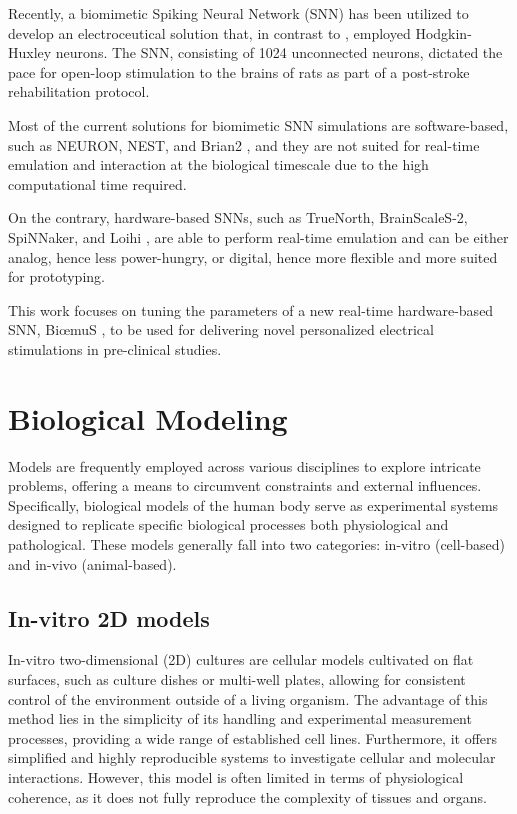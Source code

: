 Recently, a biomimet\-ic Spiking Neural Network (SNN) has been utilized to develop an electroceutical solution \cite{DiFlorio2023} that, in contrast to \cite{Buccelli2019}, employed Hodgkin-Huxley neurons. The SNN, consisting of 1024 unconnected neurons, dictated the pace for open-loop stimulation to the brains of rats as part of a post-stroke rehabilitation protocol.

Most of the current solutions for biomimetic SNN simulations are soft\-ware-based, such as NEURON, NEST, and Brian2 \cite{HinesCarnevale2001,GewaltigDiesmann2007,Stimberg2019}, and they are not suited for real-time emulation and interaction at the biological timescale due to the high computational time required.

On the contrary, hardware-based SNNs, such as TrueNorth, BrainScaleS-2, SpiNNaker, and Loihi \cite{Merolla2014,Pehle2022,Painkras2013,Davies2018,Stradmann2022}, are able to perform real-time emulation and can be either analog, hence less power-hungry, or digital, hence more flexible and more suited for prototyping.

This work focuses on tuning the parameters of a new real-time hardware-based SNN, Bi{\oe}muS \cite{Beaubois2023}, to be used for delivering novel personalized electrical stimulations in pre-clinical studies.

\section{Biological Modeling}

Models are frequently employed across various disciplines to explore intricate problems, offering a means to circumvent constraints and external influences. Specifically, biological models of the human body serve as experimental systems designed to replicate specific biological processes both physiological and pathological. These models generally fall into two categories: in-vitro (cell-based) and in-vivo (animal-based).

\subsection{In-vitro 2D models}

In-vitro two-dimensional (2D) cultures are cellular models cultivated on flat surfaces, such as culture dishes or multi-well plates, allowing for consistent control of the environment outside of a living organism. The advantage of this method lies in the simplicity of its handling and experimental measurement processes, providing a wide range of established cell lines. Furthermore, it offers simplified and highly reproducible systems to investigate cellular and molecular interactions. However, this model is often limited in terms of physiological coherence, as it does not fully reproduce the complexity of tissues and organs.

